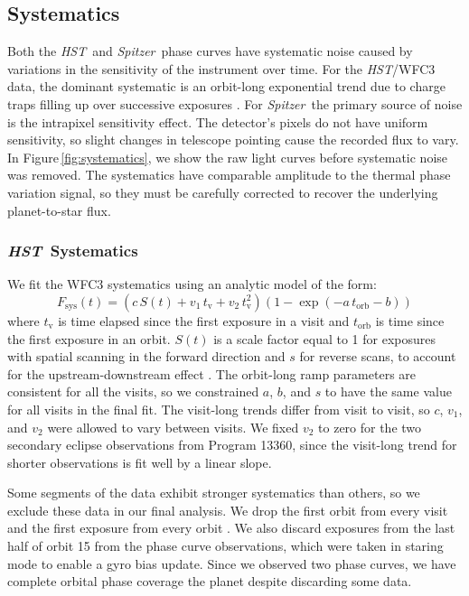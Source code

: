 \documentclass[twocolumn]{aastex61}
\newcommand{\project}[1]{\textsl{#1}}
\newcommand{\HST}{\project{HST}}
\newcommand{\Spitzer}{\project{Spitzer}}
\begin{document}
\subsection{Systematics}
Both the \HST\ and \Spitzer\ phase curves have systematic noise caused by variations in the sensitivity of the instrument over time. For the \HST/WFC3 data, the dominant systematic is an orbit-long exponential trend due to charge traps filling up over successive exposures \citep{long15, zhou17}. For \Spitzer\, the primary source of noise is the intrapixel sensitivity effect. The detector's pixels do not have uniform sensitivity, so slight changes in telescope pointing cause the recorded flux to vary. In Figure\,\ref{fig:systematics}, we show the raw light curves before systematic noise was removed. The systematics have comparable amplitude to the thermal phase variation signal, so they must be carefully corrected to recover the underlying planet-to-star flux. 

\subsubsection{\HST\ Systematics}
\label{sec:hst_sys}
We fit the WFC3 systematics using an analytic model of the form:
\begin{equation}
 F_\mathrm{sys}(t) = (c\,S(t) + v_1\,t_\mathrm{v} + v_2\,t_\mathrm{v}^2)(1 - \exp(-a\,t_\mathrm{orb} - b))
\end{equation}
where $t_\mathrm{v}$ is time elapsed since the first exposure in a visit and $t_\mathrm{orb}$ is time since the first exposure in an orbit. $S(t)$ is a scale factor equal to 1 for exposures with spatial scanning in the forward direction and $s$ for reverse scans, to account for the upstream-downstream effect \citep{mccullough12}. The orbit-long ramp parameters are consistent for all the visits, so we constrained $a$, $b$, and $s$ to have the same value for all visits in the final fit. The visit-long trends differ from visit to visit, so $c$, $v_1$, and $v_2$ were allowed to vary between visits. We fixed $v_2$ to zero for the two secondary eclipse observations from Program 13360, since the visit-long trend for shorter observations is fit well by a linear slope.

Some segments of the data exhibit stronger systematics than others, so we exclude these data in our final analysis. We drop the first orbit from every visit and the first exposure from every orbit \citep[following common practice; see e.g.][]{kreidberg14a}.  We also discard exposures from the last half of orbit 15 from the phase curve observations, which were taken in staring mode to enable a gyro bias update. Since we observed two phase curves, we have complete orbital phase coverage the planet despite discarding some data.
\end{document}
